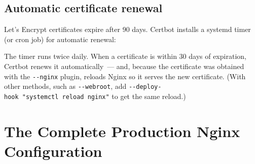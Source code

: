 \begin{codebox}[short]

\begin{Shaded}
\begin{Highlighting}[]
\end{Highlighting}
\end{Shaded}

\end{codebox}

\subsection*{Automatic certificate renewal}\label{28-traffic-routing:automatic-certificate-renewal}

Let's Encrypt certificates expire after 90 days. Certbot installs a systemd timer (or cron job) for automatic renewal:

\begin{codebox}[short]

\begin{Shaded}
\begin{Highlighting}[]

\end{Highlighting}
\end{Shaded}

\end{codebox}

\noindent{}The timer runs twice daily. When a certificate is within 30 days of expiration, Certbot renews it automatically~--- and, because the certificate was obtained with the \texttt{-\/-nginx} plugin, reloads Nginx so it serves the new certificate. (With other methods, such as \texttt{-\/-webroot}, add \texttt{-}\allowbreak{}\texttt{-}\allowbreak{}\texttt{deploy-}\allowbreak{}\texttt{hook\ "systemctl\ reload\ nginx"} to get the same reload.)

\setcounter{section}{5}
\section{The Complete Production Nginx Configuration}\label{28-traffic-routing:286-the-complete-production-nginx-configuration}

